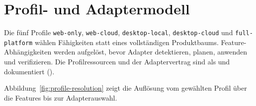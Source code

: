 \section{Profil- und Adaptermodell}
\label{chap:profile-adapter-model}

Die fünf Profile \texttt{web-only}, \texttt{web-cloud}, \texttt{desktop-local},
\texttt{desktop-cloud} und \texttt{full-platform} wählen Fähigkeiten statt eines
vollständigen Produktbaums. Feature-Abhängigkeiten werden aufgelöst, bevor Adapter
detektieren, planen, anwenden und verifizieren. Die Profilressourcen und der
Adaptervertrag sind als \Implemented{} und \Verified{} dokumentiert
().

Abbildung~\ref{fig:profile-resolution} zeigt die Auflösung vom gewählten Profil
über die Features bis zur Adapterauswahl.

